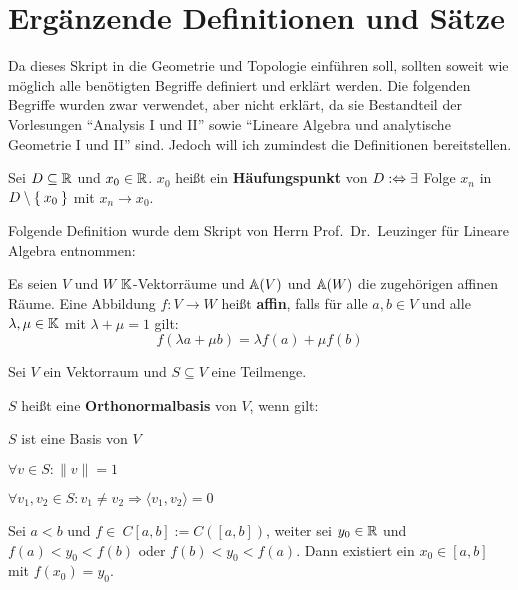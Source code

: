 \chapter*{Ergänzende Definitionen und Sätze}

Da dieses Skript in die Geometrie und Topologie einführen soll, sollten soweit
wie möglich alle benötigten Begriffe definiert und erklärt werden. Die folgenden
Begriffe wurden zwar verwendet, aber nicht erklärt, da sie Bestandteil der
Vorlesungen \enquote{Analysis I und II} sowie \enquote{Lineare Algebra und analytische Geometrie I und II}
sind. Jedoch will ich zumindest die Definitionen bereitstellen.

\begin{definition}%
	Sei $D \subseteq \mathbb{R}$ und $x_0 \in \mathbb{R}$. $x_0$ heißt ein \textbf{Häufungspunkt}
	von $D :\Leftrightarrow \exists$ Folge $x_n$ in $D \setminus \Set{x_0}$ mit $x_n \rightarrow x_0$.
\end{definition}

Folgende Definition wurde dem Skript von Herrn Prof.~Dr.~Leuzinger für
Lineare Algebra entnommen:

\begin{definition}%
	Es seien $V$ und $W$ $\mathbb{K}$-Vektorräume und $\mathbb{A}(V)$ und $\mathbb{A}(W)$ die 
	zugehörigen affinen Räume. Eine Abbildung $f:V \rightarrow W$ heißt \textbf{affin},
	falls für alle $a, b \in V$ und alle $\lambda, \mu \in \mathbb{K}$ mit $\lambda + \mu = 1$ gilt:
	\[f(\lambda a + \mu b) = \lambda f(a) + \mu f(b)\]
\end{definition}

\begin{definition}%
	Sei $V$ ein Vektorraum und $S \subseteq V$ eine Teilmenge.

	$S$ heißt eine \textbf{Orthonormalbasis} von $V$, wenn gilt:
	\begin{defenumprops}
		\item $S$ ist eine Basis von $V$
		\item $\forall v \in S: \|v\| = 1$
		\item $\forall v_1, v_2 \in S: v_1 \neq v_2 \Rightarrow \langle v_1, v_2 \rangle = 0$
	\end{defenumprops}
\end{definition}

\begin{satz*}[Zwischenwertsatz]%
	Sei $a<b$ und $f \in\ C[a, b]:=C([a, b])$, weiter sei $y_0 \in \mathbb{R}$ und 
	$f(a) < y_0 < f(b)$ oder $f(b) < y_0 < f(a)$. Dann existiert ein 
	$x_0 \in [a, b]$ mit $f(x_0) = y_0$.
\end{satz*}


